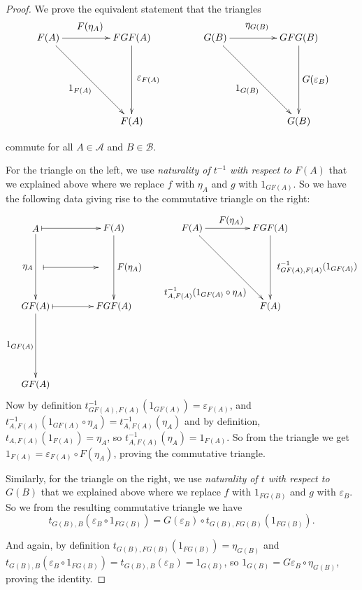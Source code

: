 \documentclass[11pt]{article}
\theoremstyle{definition}
\theoremstyle{definition}
\theoremstyle{plain}
\theoremstyle{plain}
\theoremstyle{plain}
\begin{document}
\begin{proof}
We prove the equivalent statement that the triangles 
\begin{equation*}
\begin{xy}
(0,0)*+{F(A)}="f1"; (30,0)*+{FGF(A)}="fgf"; (30,-30)*+{F(A)}="f2";
(60,0)*+{G(B)}="g1"; (90,0)*+{GFG(B)}="gfg"; (90, -30)*+{G(B)}="g2";
{\ar "f1";"fgf"}?*!/_4mm/{F(\eta_{A})}; {\ar "fgf";"f2"}?*!/_6mm/{\varepsilon_{F(A)}}; {\ar "f1";"f2"}?*!/^5mm/{1_{F(A)}};
{\ar "g1";"gfg"}?*!/_4mm/{\eta_{G(B)}}; {\ar "gfg";"g2"}?*!/_6mm/{G(\varepsilon_{B})}; {\ar "g1";"g2"}?*!/^5mm/{1_{G(B)}};
\end{xy}
\end{equation*}

commute for all $A \in \mathscr{A}$ and $B \in \mathscr{B}$.

For the triangle on the left, we use \emph{naturality of $t^{-1}$ with respect to $F(A)$} that we explained above where we replace $f$ with $\eta_{A}$ and $g$ with $1_{GF(A)}$. So we have the following data giving rise to the commutative triangle on the right:

\begin{equation*}
\begin{xy}
(0,0)*+{A}="a"; (30, 0)*+{F(A)}="fa"; (0, -30)*+{GF(A)}="gfa1"; (30, -30)*+{FGF(A)}="fgfa"; (00, -60)*+{GF(A)}="gfa2";
(60,0)*+{F(A)}="fat1"; (90, 0)*+{FGF(A)}="fgfat"; (90, -30)*+{F(A)}="fat2";
{\ar "a";"gfa1"}?*!/^3mm/{\eta_{A}}; {\ar "fa";"fgfa"}?*!/_6mm/{F(\eta_{A})}; {\ar "gfa1";"gfa2"}?*!/^6mm/{1_{GF(A)}};
{\ar@{|->} "a";"fa"}; {\ar@{|->} (3,-15);(24, -15)}; {\ar@{|->} "gfa1";"fgfa"};
{\ar "fat1";"fgfat"}?*!/_3mm/{F(\eta_{A})};
{\ar "fgfat";"fat2"}?*!/_18mm/{t^{-1}_{GF(A),F(A)}(1_{GF(A)})};
{\ar "fat1";"fat2"}?*!/^14mm/{t^{-1}_{A,F(A)}(1_{GF(A)} \circ \eta_{A})}
\end{xy}
\end{equation*}
Now by definition $t^{-1}_{GF(A),F(A)}(1_{GF(A)})=\varepsilon_{F(A)}$, and $t^{-1}_{A,F(A)}(1_{GF(A)} \circ \eta_{A})=t^{-1}_{A,F(A)}(\eta_{A})$ and by definition, $t_{A,F(A)}(1_{F(A)}) = \eta_{A}$, so $t^{-1}_{A,F(A)}(\eta_{A})=1_{F(A)}$. So from the triangle we get $1_{F(A)} = \varepsilon_{F(A)} \circ F(\eta_{A})$, proving the commutative triangle.

Similarly, for the triangle on the right, we use \emph{naturality of $t$ with respect to $G(B)$} that we explained above where we replace $f$ with $1_{FG(B)}$ and $g$ with $\varepsilon_{B}$. So we from the resulting commutative triangle we have
\begin{equation*}
t_{G(B),B}(\varepsilon_{B} \circ 1_{FG(B)}) = G(\varepsilon_{B}) \circ t_{G(B),FG(B)}(1_{FG(B)}).
\end{equation*}

And again, by definition $t_{G(B),FG(B)}(1_{FG(B)})=\eta_{G(B)}$ and $t_{G(B),B}(\varepsilon_{B} \circ 1_{FG(B)})=t_{G(B),B}(\varepsilon_{B})=1_{G(B)}$, so $1_{G(B)}=G\varepsilon_{B} \circ \eta_{G(B)}$, proving the identity.

\end{proof}
 
 \nocite{*}
 
 
\end{document}
